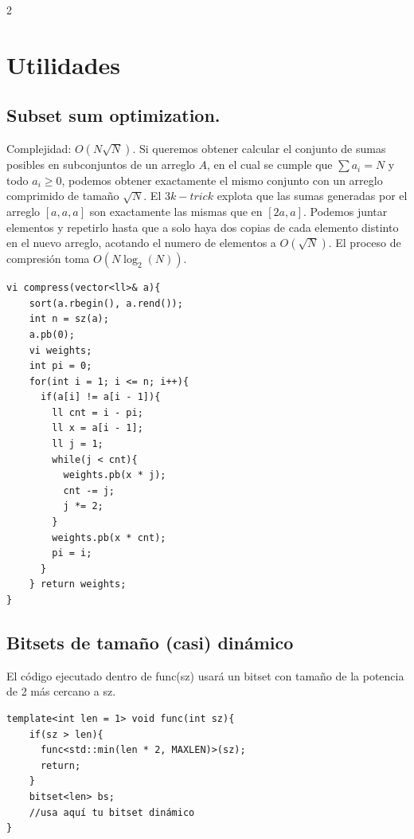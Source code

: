\documentclass[10pt,spanish,mexico]{article}
\numberwithin{equation}{section}
\begin{document}
\begin{multicols}{2}
\vspace{-1.2\baselineskip}
\hrulefill
\section{Utilidades}
\subsection{Subset sum optimization.}
Complejidad: $O(N\sqrt{N})$. Si queremos obtener calcular el conjunto de sumas posibles en subconjuntos de un arreglo $A$, en el cual se cumple que $\sum a_i = N$ y todo $a_i\geq0$, podemos obtener exactamente el mismo conjunto con un arreglo comprimido de tamaño $\sqrt{N}$. El $3k-trick$ explota que las sumas generadas por el arreglo $[a,a,a]$ son exactamente las mismas que en $[2a,a]$. Podemos juntar elementos y repetirlo hasta que a solo haya dos copias de cada elemento distinto en el nuevo arreglo, acotando el numero de elementos a $O(\sqrt{N})$. El proceso de compresión toma $O(N\log_2(N))$.
\begin{verbatim}
vi compress(vector<ll>& a){
    sort(a.rbegin(), a.rend());
    int n = sz(a);
    a.pb(0);
    vi weights;
    int pi = 0;
    for(int i = 1; i <= n; i++){
      if(a[i] != a[i - 1]){
        ll cnt = i - pi;
        ll x = a[i - 1];
        ll j = 1;
        while(j < cnt){
          weights.pb(x * j);
          cnt -= j;
          j *= 2;
        }
        weights.pb(x * cnt);
        pi = i;
      }
    } return weights;
}
\end{verbatim}

\vspace{-1.2\baselineskip}
\hrulefill
\subsection{Bitsets de tamaño (casi) dinámico}
El código ejecutado dentro de func(sz) usará un bitset con tamaño de la potencia de 2 más cercano a sz.
\begin{verbatim}
template<int len = 1> void func(int sz){
    if(sz > len){
      func<std::min(len * 2, MAXLEN)>(sz);
      return;
    }
    bitset<len> bs;
    //usa aquí tu bitset dinámico
}
\end{verbatim}

\vspace{-1.2\baselineskip}
\hrulefill

\end{multicols}
\end{document}
